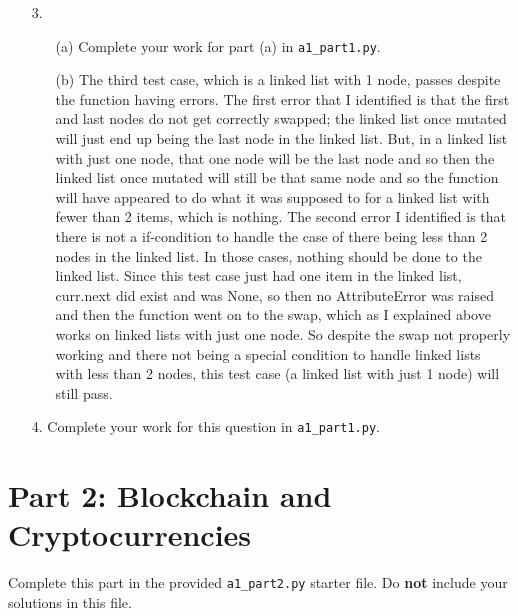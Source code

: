 \documentclass[11pt]{article}
\begin{document}
\begin{enumerate}
\item[3.]
\begin{enumerate}
    \item[(a)]
    Complete your work for part (a) in \texttt{a1\_part1.py}.
    \item[(b)]
    The third test case, which is a linked list with 1 node, passes despite the function having errors. The first error that I identified is that the first and last nodes do not get correctly swapped; the linked list once mutated will just end up being the last node in the linked list. But, in a linked list with just one node, that one node will be the last node and so then the linked list once mutated will still be that same node and so the function will have appeared to do what it was supposed to for a linked list with fewer than 2 items, which is nothing. The second error I identified is that there is not a if-condition to handle the case of there being less than 2 nodes in the linked list. In those cases, nothing should be done to the linked list. Since this test case just had one item in the linked list, curr.next did exist and was None, so then no AttributeError was raised and then the function went on to the swap, which as I explained above works on linked lists with just one node. So despite the swap not properly working and there not being a special condition to handle linked lists with less than 2 nodes, this test case (a linked list with just 1 node) will still pass.
\end{enumerate}

\item[4.]
Complete your work for this question in \texttt{a1\_part1.py}.

\end{enumerate}

\section*{Part 2: Blockchain and Cryptocurrencies}

Complete this part in the provided \texttt{a1\_part2.py} starter file.
Do \textbf{not} include your solutions in this file.
\end{document}

